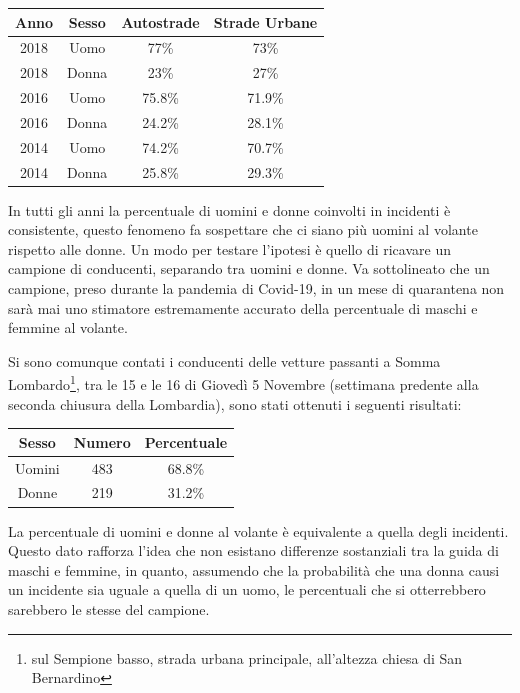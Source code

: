 \documentclass[a4paper,12pt]{report}
\begin{document}
\begin{center}
    \def\arraystretch{1.5}%
    \begin{tabular}{ |c|c|c|c| }
        \hline
        Anno & Sesso & Autostrade & Strade Urbane \\ 
        \hline
        \rowcolor{TableGray}
        2018 & Uomo & 77\%  & 73\% \\
        2018 & Donna & 23\% & 27\% \\
        \rowcolor{TableGray}
        2016 & Uomo & 75.8\%  & 71.9\% \\
        2016 & Donna & 24.2\% & 28.1\% \\
        \rowcolor{TableGray}
        2014 & Uomo & 74.2\%  & 70.7\% \\
        2014 & Donna & 25.8\% & 29.3\% \\
        \hline
    \end{tabular}
\end{center}

In tutti gli anni la percentuale di uomini e donne coinvolti in incidenti è consistente, 
questo fenomeno fa sospettare che ci siano più uomini al volante rispetto alle donne.
Un modo per testare l'ipotesi è quello di ricavare un campione di conducenti, 
separando tra uomini e donne.
Va sottolineato che un campione, preso durante la pandemia di Covid-19, in un 
mese di quarantena non sarà mai uno stimatore estremamente accurato della percentuale 
di maschi e femmine al volante.

Si sono comunque contati i conducenti delle vetture passanti a Somma 
Lombardo\footnote{sul Sempione basso, strada urbana principale, all'altezza 
chiesa di San Bernardino}, 
tra le 15 e le 16 di Giovedì 5 Novembre 
(settimana predente alla seconda chiusura della Lombardia), 
sono stati ottenuti i seguenti risultati:

\begin{center}
    \def\arraystretch{1.5}%
    \begin{tabular}{ |c|c|c| }
        \hline
        Sesso & Numero & Percentuale \\ 
        \hline
        \rowcolor{TableGray}
        Uomini & 483 & 68.8\% \\
        Donne & 219 & 31.2\% \\
        \hline
    \end{tabular}
\end{center}

La percentuale di uomini e donne al volante è equivalente a quella degli incidenti.
Questo dato rafforza l'idea che non esistano differenze sostanziali tra la guida di 
maschi e femmine, in quanto, assumendo che la probabilità che una donna causi un 
incidente sia uguale a quella di un uomo, le percentuali che si otterrebbero sarebbero 
le stesse del campione.
\end{document}
